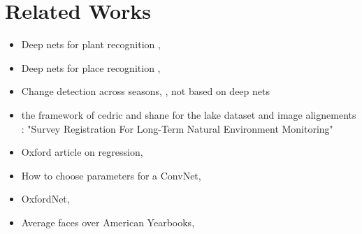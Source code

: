 \section{Related Works}

\begin{itemize}
    \item Deep nets for plant recognition \cite{Reyes2015},
    \item Deep nets for place recognition \cite{Sunderhauf2015},
    \item Change detection across seasons, \cite{Neubert2013}, not based on deep nets
    \item the framework of cedric and shane for the lake dataset and image alignements : "Survey Registration For Long-Term Natural Environment Monitoring"
    \item Oxford article on regression, \cite{conf/accv/PfisterSCZ14}
    \item How to choose parameters for a ConvNet, \cite{NIPS2012_4824}
    \item OxfordNet, \cite{Simonyan14c}
    \item Average faces over American Yearbooks, \cite{ginosar2015century}
\end{itemize}


